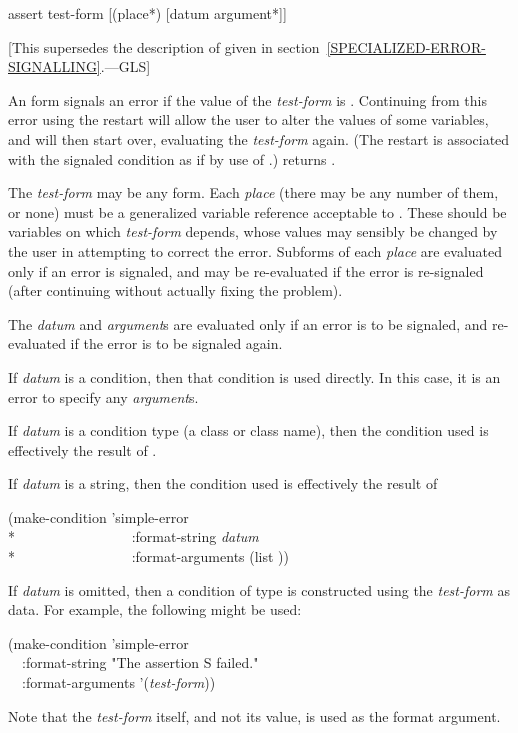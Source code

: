 \begin{defmac}
assert test-form [({place}*) [datum {argument}*]]

   [This supersedes the description of 
   given in section~\ref{SPECIALIZED-ERROR-SIGNALLING}.---GLS]

  An  form signals an error if the value of the {\it test-form} is .
  Continuing from this
  error using the  restart will allow the user to alter the values
  of some variables, and  will then start over, evaluating the {\it test-form}
  again.
(The restart is associated with the signaled condition as if by
use of .)
 returns .

  The {\it test-form} may be any form. Each {\it place} (there may be any number of them, 
  or none) must be a generalized variable reference acceptable to .
  These should be variables on which {\it test-form} depends, whose values
  may sensibly be changed by the user in attempting to correct the error.
  Subforms of each {\it place} are evaluated only if an error is signaled, and
  may be re-evaluated if the error is re-signaled (after continuing without
  actually fixing the problem).

  The {\it datum} and {\it argument\/}s are evaluated only if an error is to be
  signaled, and re-evaluated if the error is to be signaled again.

  If {\it datum} is a condition, then that condition is used directly. 
  In this case, it is an error to specify any {\it argument\/}s.

  If {\it datum} is a condition type (a class or class name), then the condition used is effectively the result
  of .

  If {\it datum} is a string, then the condition used is effectively the result of
\begin{lisp}
(make-condition 'simple-error \\*
~~~~~~~~~~~~~~~~:format-string {\it datum} \\*
~~~~~~~~~~~~~~~~:format-arguments (list ))
\end{lisp}

  If {\it datum} is omitted, then a condition of type  is 
  constructed using the {\it test-form} as data. For example, the following
  might be used:
\begin{lisp}
(make-condition 'simple-error \\
~~:format-string "The assertion {\Xtilde}S failed." \\
~~:format-arguments '({\it test-form}))
\end{lisp}
Note that the {\it test-form} itself, and not its value, is used as the format argument.


\end{defmac}
